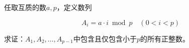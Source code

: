 

任取互质的数$a, p$，定义数列

\[ A_i = a \cdot i \bmod p \quad (0 < i < p) \]

求证：$A_1, A_2, \dots, A_{p - 1}$中包含且仅包含小于$p$的所有正整数。
